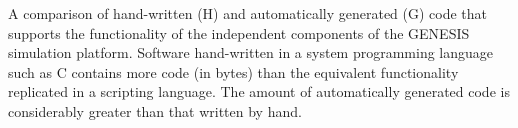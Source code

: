 \documentclass[10pt]{article}
\begin{document}
%
%
\begin{table}[ht]
\caption{
\bf{Comparison of Hand-Written and Generated Code (in Byte Counts).}}







\begin{flushleft} A comparison of hand-written (H) and automatically generated (G) code that supports the functionality of the independent components of the GENESIS simulation platform. Software hand-written in a system programming language such as C contains more code (in bytes) than the equivalent functionality replicated in a scripting language. The amount of automatically generated code is considerably greater than that written by hand.
\end{flushleft}
\label{tab:cbi-codecounts}
\end{table}


\end{document}
